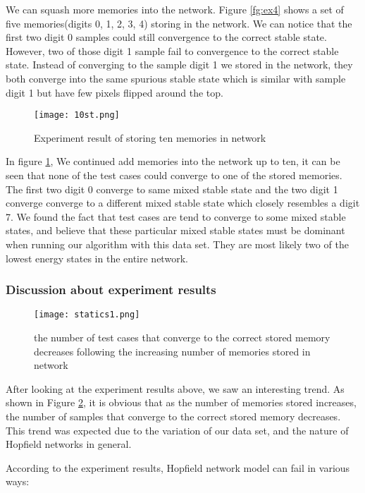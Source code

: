 We can squash more memories into the network. Figure \ref{fg:ex4} shows a set of five memories(digits 0, 1, 2, 3, 4) storing in the network. We can notice that the first two digit 0 samples could still convergence to the correct stable state. However, two of those digit 1 sample fail to convergence to the correct stable state. Instead of converging to the sample digit 1 we stored in the network, they both converge into the same spurious stable state which is similar with sample digit 1 but have few pixels flipped around the top.\\

\begin{figure}[h]
\centering
\texttt{[image: 10st.png]}
\caption{Experiment result of storing ten memories in network}
\label{fg:ex5}
\end{figure}

In figure \ref{fg:ex5}, We continued add memories into the network up to ten, it can be seen that none of the test cases could converge to one of the stored memories. The first two digit 0 converge to same mixed stable state and the two digit 1 converge converge to a different mixed stable state which closely resembles a digit 7. We found the fact that test cases are tend to converge to some mixed stable states, and believe that these particular mixed stable states must be dominant when running our algorithm with this data set. They are most likely two of the lowest energy states in the entire network.

\subsubsection{Discussion about experiment results}
\begin{figure}[h]
\centering
\texttt{[image: statics1.png]}
\caption{the number of test cases that converge to the correct stored memory decreases following the increasing number of memories stored in network}
\label{fg:ex6}
\end{figure}
After looking at the experiment results above, we saw an interesting trend. As shown in Figure \ref{fg:ex6}, it is obvious that as the number of memories stored increases, the number of samples that converge to the correct stored memory decreases. This trend was expected due to the variation of our data set, and the nature of Hopfield networks in general. \newpage

According to the experiment results, Hopfield network model can fail in various ways:\\

